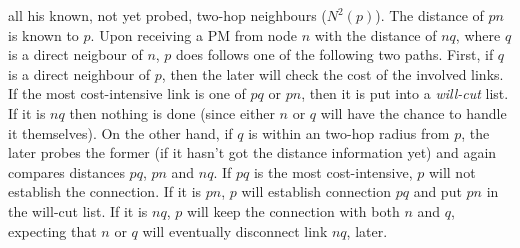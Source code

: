 all his known, not yet probed, two-hop neighbours ($ N^2(p)$). The distance of
$pn$ is known to $p$. Upon receiving a PM from node $n$ with the distance of
$nq$, where $q$ is a direct neigbour of $n$, $p$ does follows one of the
following two paths. First, if $q$ is a direct neighbour of $p$, then the later
will check the cost of the involved links. If the most cost-intensive link is
one of $pq$ or $pn$, then it is put into a \emph{will-cut} list. If it is $nq$
then nothing is done (since either $n$ or $q$ will have the chance to handle it
themselves). On the other hand, if $q$ is within an two-hop radius from $p$,
the later probes the former (if it hasn't got the distance information yet) and
again compares distances $pq$, $pn$ and $nq$. If $pq$ is the most
cost-intensive, $p$ will not establish the connection. If it is $pn$, $p$ will
establish connection $pq$ and put $pn$ in the will-cut list. If it is $nq$, $p$
will keep the connection with both $n$ and $q$, expecting that $n$ or $q$ will
eventually disconnect link $nq$, later.

%
%
%


